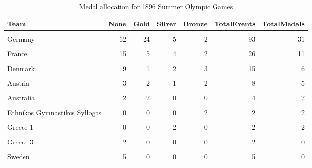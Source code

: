 \documentclass[
]{article}
\begin{document}
\begin{table}[H]
\centering
\caption{\label{tab:SummerBreakDownWinners1}Medal allocation for 1896 Summer Olympic Games}
\centering
\fontsize{7}{9}\selectfont
\begin{tabular}[t]{lrrrrrr}
\toprule
Team & None & Gold & Silver & Bronze & TotalEvents & TotalMedals\\
\midrule
\cellcolor{gray!10}{Greece} & \cellcolor{gray!10}{96} & \cellcolor{gray!10}{10} & \cellcolor{gray!10}{16} & \cellcolor{gray!10}{18} & \cellcolor{gray!10}{140} & \cellcolor{gray!10}{44}\\
Germany & 62 & 24 & 5 & 2 & 93 & 31\\
\cellcolor{gray!10}{United States} & \cellcolor{gray!10}{7} & \cellcolor{gray!10}{11} & \cellcolor{gray!10}{7} & \cellcolor{gray!10}{2} & \cellcolor{gray!10}{27} & \cellcolor{gray!10}{20}\\
France & 15 & 5 & 4 & 2 & 26 & 11\\
\cellcolor{gray!10}{Great Britain} & \cellcolor{gray!10}{16} & \cellcolor{gray!10}{2} & \cellcolor{gray!10}{3} & \cellcolor{gray!10}{2} & \cellcolor{gray!10}{23} & \cellcolor{gray!10}{7}\\
\addlinespace
Denmark & 9 & 1 & 2 & 3 & 15 & 6\\
\cellcolor{gray!10}{Hungary} & \cellcolor{gray!10}{12} & \cellcolor{gray!10}{2} & \cellcolor{gray!10}{1} & \cellcolor{gray!10}{3} & \cellcolor{gray!10}{18} & \cellcolor{gray!10}{6}\\
Austria & 3 & 2 & 1 & 2 & 8 & 5\\
\cellcolor{gray!10}{Switzerland} & \cellcolor{gray!10}{5} & \cellcolor{gray!10}{1} & \cellcolor{gray!10}{2} & \cellcolor{gray!10}{0} & \cellcolor{gray!10}{8} & \cellcolor{gray!10}{3}\\
Australia & 2 & 2 & 0 & 0 & 4 & 2\\
\addlinespace
\cellcolor{gray!10}{Australia/Great Britain} & \cellcolor{gray!10}{0} & \cellcolor{gray!10}{0} & \cellcolor{gray!10}{0} & \cellcolor{gray!10}{2} & \cellcolor{gray!10}{2} & \cellcolor{gray!10}{2}\\
Ethnikos Gymnastikos Syllogos & 0 & 0 & 0 & 2 & 2 & 2\\
\cellcolor{gray!10}{Great Britain/Germany} & \cellcolor{gray!10}{0} & \cellcolor{gray!10}{2} & \cellcolor{gray!10}{0} & \cellcolor{gray!10}{0} & \cellcolor{gray!10}{2} & \cellcolor{gray!10}{2}\\
Greece-1 & 0 & 0 & 2 & 0 & 2 & 2\\
\cellcolor{gray!10}{Greece-2} & \cellcolor{gray!10}{2} & \cellcolor{gray!10}{0} & \cellcolor{gray!10}{0} & \cellcolor{gray!10}{0} & \cellcolor{gray!10}{2} & \cellcolor{gray!10}{0}\\
\addlinespace
Greece-3 & 2 & 0 & 0 & 0 & 2 & 0\\
\cellcolor{gray!10}{Italy} & \cellcolor{gray!10}{1} & \cellcolor{gray!10}{0} & \cellcolor{gray!10}{0} & \cellcolor{gray!10}{0} & \cellcolor{gray!10}{1} & \cellcolor{gray!10}{0}\\
Sweden & 5 & 0 & 0 & 0 & 5 & 0\\
\bottomrule
\end{tabular}
\end{table}
\end{document}
